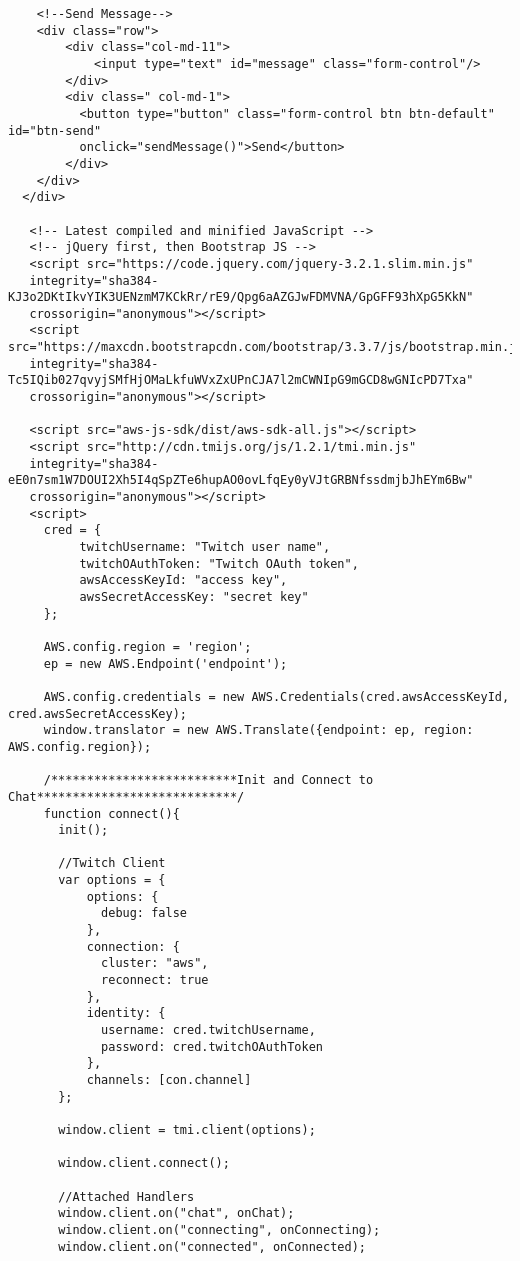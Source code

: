\documentclass[runningheads]{llncs}
\begin{document}
{\begin{verbatim}
    <!--Send Message-->
    <div class="row">
        <div class="col-md-11">
            <input type="text" id="message" class="form-control"/>
        </div>
        <div class=" col-md-1">
          <button type="button" class="form-control btn btn-default" id="btn-send"
          onclick="sendMessage()">Send</button>
        </div>
    </div>
  </div>

   <!-- Latest compiled and minified JavaScript -->
   <!-- jQuery first, then Bootstrap JS -->
   <script src="https://code.jquery.com/jquery-3.2.1.slim.min.js"
   integrity="sha384-KJ3o2DKtIkvYIK3UENzmM7KCkRr/rE9/Qpg6aAZGJwFDMVNA/GpGFF93hXpG5KkN"
   crossorigin="anonymous"></script>
   <script src="https://maxcdn.bootstrapcdn.com/bootstrap/3.3.7/js/bootstrap.min.js"
   integrity="sha384-Tc5IQib027qvyjSMfHjOMaLkfuWVxZxUPnCJA7l2mCWNIpG9mGCD8wGNIcPD7Txa"
   crossorigin="anonymous"></script>

   <script src="aws-js-sdk/dist/aws-sdk-all.js"></script>
   <script src="http://cdn.tmijs.org/js/1.2.1/tmi.min.js"
   integrity="sha384-eE0n7sm1W7DOUI2Xh5I4qSpZTe6hupAO0ovLfqEy0yVJtGRBNfssdmjbJhEYm6Bw"
   crossorigin="anonymous"></script>
   <script>
     cred = {
          twitchUsername: "Twitch user name",
          twitchOAuthToken: "Twitch OAuth token",
          awsAccessKeyId: "access key",
          awsSecretAccessKey: "secret key"
     };

     AWS.config.region = 'region';
     ep = new AWS.Endpoint('endpoint');

     AWS.config.credentials = new AWS.Credentials(cred.awsAccessKeyId, cred.awsSecretAccessKey);
     window.translator = new AWS.Translate({endpoint: ep, region: AWS.config.region});

     /**************************Init and Connect to Chat****************************/
     function connect(){
       init();

       //Twitch Client
       var options = {
           options: {
             debug: false
           },
           connection: {
             cluster: "aws",
             reconnect: true
           },
           identity: {
             username: cred.twitchUsername,
             password: cred.twitchOAuthToken
           },
           channels: [con.channel]
       };

       window.client = tmi.client(options);

       window.client.connect();

       //Attached Handlers
       window.client.on("chat", onChat);
       window.client.on("connecting", onConnecting);
       window.client.on("connected", onConnected);


\end{verbatim}}
\end{document}
